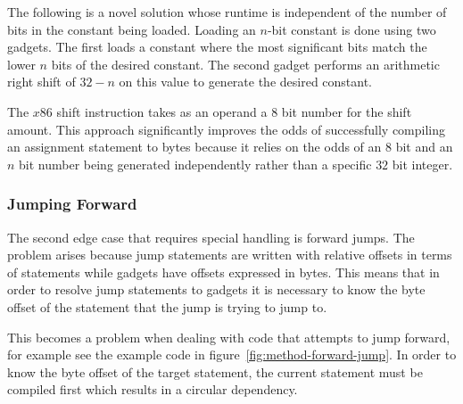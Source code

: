     The following is a novel solution whose runtime is independent of the number
    of bits in the constant being loaded. Loading an $n$-bit constant is done
    using two gadgets. The first loads a constant where the most significant
    bits match the lower $n$ bits of the desired constant. The second gadget
    performs an arithmetic right shift of $32-n$ on this value to generate the
    desired constant.

    The $x86$ shift instruction takes as an operand a $8$ bit number for the
    shift amount. This approach significantly improves the odds of successfully
    compiling an assignment statement to bytes because it relies on the odds of
    an $8$ bit and an $n$ bit number being generated independently rather than a
    specific $32$ bit integer.

    \subsubsection{Jumping Forward}

    The second edge case that requires special handling is forward jumps. The
    problem arises because jump statements are written with relative offsets in
    terms of statements while gadgets have offsets expressed in bytes. This
    means that in order to resolve jump statements to gadgets it is necessary to
    know the byte offset of the statement that the jump is trying to jump to.

    This becomes a problem when dealing with code that attempts to jump forward,
    for example see the example code in figure~\ref{fig:method-forward-jump}.
    In order to know the byte offset of the target statement, the current
    statement must be compiled first which results in a circular dependency.

